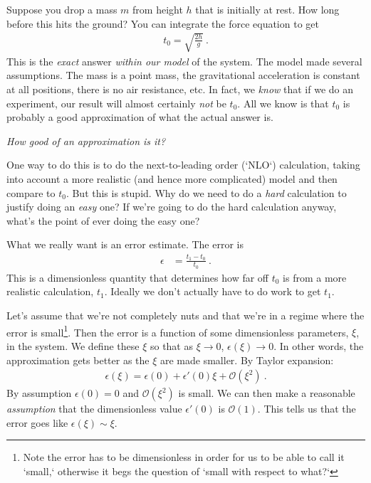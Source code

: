 Suppose you drop a mass $m$ from height $h$ that is initially at rest. How long before this hits the ground? You can integrate the force equation to get
\begin{align}
  t_0 = \sqrt{\frac{2h}{g}} \ .
\end{align}
This is the \emph{exact} answer \emph{within our model} of the system. The model made several assumptions. The mass is a point mass, the gravitational acceleration is constant at all positions, there is no air resistance, etc. In fact, we \emph{know} that if we do an experiment, our result will almost certainly \emph{not} be $t_0$. All we know is that $t_0$ is probably a good approximation of what the actual answer is.

\emph{How good of an approximation is it?}

One way to do this is to do the next-to-leading order (`NLO‘) calculation, taking into account a more realistic (and hence more complicated) model and then compare to $t_0$. But this is stupid. Why do we need to do a \emph{hard} calculation to justify doing an \emph{easy} one? If we’re going to do the hard calculation anyway, what’s the point of ever doing the easy one?

What we really want is an error estimate. The error is
\begin{align}
  \epsilon &= \frac{t_1 - t_0}{t_0} \ .
\end{align}
This is a dimensionless quantity that determines how far off $t_0$ is from a more realistic calculation, $t_1$. Ideally we don’t actually have to do work to get $t_1$. 

Let’s assume that we’re not completely nuts and that we’re in a regime where the error is small\footnote{Note the error has to be dimensionless in order for us to be able to call it `small,` otherwise it begs the question of `small with respect to what?`}. Then the error is a function of some dimensionless parameters, $\xi$, in the system. We define these $\xi$ so that as $\xi \to 0$, $\epsilon(\xi) \to 0$. In other words, the approximation gets better as the $\xi$ are made smaller. By Taylor expansion:
\begin{align}
  \epsilon(\xi) = \epsilon(0) + \epsilon'(0) \xi + \mathcal O(\xi^2) \ .
\end{align}
By assumption  $\epsilon(0) = 0$ and $\mathcal O(\xi^2)$ is  small. We can then make a reasonable \emph{assumption} that the dimensionless value $\epsilon'(0)$  is $\mathcal O(1)$. This tells us that the error goes like $\epsilon(\xi) \sim \xi$.

